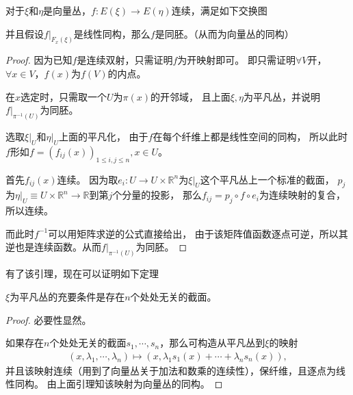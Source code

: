     \begin{lemma}
        对于$\xi$和$\eta$是向量丛，$f:E(\xi)\to E(\eta)$连续，满足如下交换图
        并且假设$f|_{F_x(\xi)}$是线性同构，那么$f$是同胚。（从而为向量丛的同构）
    \end{lemma}
    \begin{proof}
        因为已知$f$是连续双射，只需证明$f$为开映射即可。
        即只需证明$\forall V$开，$\forall x\in V$，$f(x)$为$f(V)$的内点。

        \qquad 在$x$选定时，只需取一个$U$为$\pi(x)$的开邻域，
        且上面$\xi,\eta$为平凡丛，并说明$f|_{\pi^{-1}(U)}$为同胚。

        \qquad 选取$\xi|_U$和$\eta|_U$上面的平凡化，
        由于$f$在每个纤维上都是线性空间的同构，
        所以此时$f$形如$f=(f_{ij}(x))_{1\le i,j\le n},x\in U$。

        \qquad 首先$f_{ij}(x)$连续。
        因为取$e_i:U\to U\times\mathbb{R}^n$为$\xi|_U$这个平凡丛上一个标准的截面，
        $p_j$为$\eta|_U\equiv U\times\mathbb{R}^n\to \mathbb{R}$到第$j$个分量的投影，
        那么$f_{ij}=p_j\circ f\circ e_i$为连续映射的复合，所以连续。

        \qquad 而此时$f^{-1}$可以用矩阵求逆的公式直接给出，
        由于该矩阵值函数逐点可逆，所以其逆也是连续函数。从而$f|_{\pi^{-1}(U)}$为同胚。
    \end{proof}

    \qquad 有了该引理，现在可以证明如下定理

    \begin{theorem}
        $\xi$为平凡丛的充要条件是存在$n$个处处无关的截面。
    \end{theorem}
    \begin{proof}
        必要性显然。

        \qquad 如果存在$n$个处处无关的截面$s_1,\cdots,s_n$，那么可构造从平凡丛到$\xi$的映射
        $$
            \begin{aligned}
                (x,\lambda_1,\cdots,\lambda_n)\mapsto 
                (x,\lambda_1 s_1(x)+\cdots+\lambda_n s_n(x)),
            \end{aligned}
        $$
        并且该映射连续（用到了向量丛关于加法和数乘的连续性），保纤维，且逐点为线性同构。
        由上面引理知该映射为向量丛的同构。
    \end{proof}

